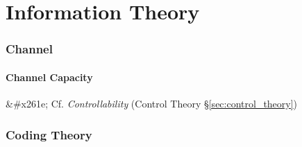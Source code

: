 \part{Information Theory}\label{part:information_theory} \cite{shannon48}

\section{Channel}\label{sec:channel}

\subsection{Channel Capacity}\label{sec:channel_capacity}

&#x261e; Cf. \emph{Controllability} (Control Theory
\S\ref{sec:control_theory})



\section{Coding Theory}\label{sec:coding_theory}
